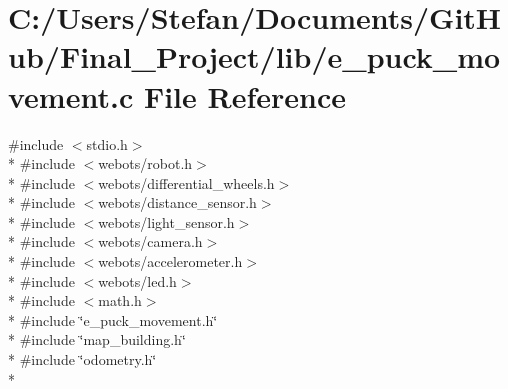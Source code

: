 \section{C\-:/\-Users/\-Stefan/\-Documents/\-Git\-Hub/\-Final\-\_\-\-Project/lib/e\-\_\-puck\-\_\-movement.c File Reference}
\label{lib_2e__puck__movement_8c}
{\ttfamily \#include $<$stdio.\-h$>$}\\*
{\ttfamily \#include $<$webots/robot.\-h$>$}\\*
{\ttfamily \#include $<$webots/differential\-\_\-wheels.\-h$>$}\\*
{\ttfamily \#include $<$webots/distance\-\_\-sensor.\-h$>$}\\*
{\ttfamily \#include $<$webots/light\-\_\-sensor.\-h$>$}\\*
{\ttfamily \#include $<$webots/camera.\-h$>$}\\*
{\ttfamily \#include $<$webots/accelerometer.\-h$>$}\\*
{\ttfamily \#include $<$webots/led.\-h$>$}\\*
{\ttfamily \#include $<$math.\-h$>$}\\*
{\ttfamily \#include \char`\"{}e\-\_\-puck\-\_\-movement.\-h\char`\"{}}\\*
{\ttfamily \#include \char`\"{}map\-\_\-building.\-h\char`\"{}}\\*
{\ttfamily \#include \char`\"{}odometry.\-h\char`\"{}}\\*
